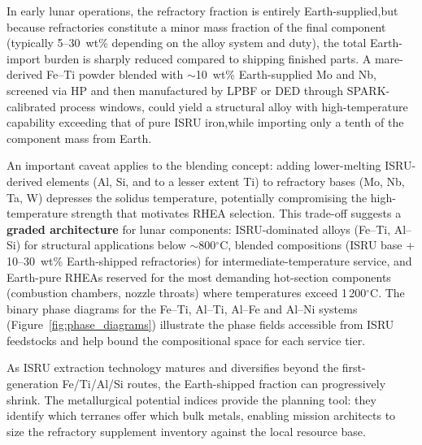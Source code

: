 \documentclass[11pt,a4paper]{article}
\begin{document}
In early lunar operations, the refractory fraction is entirely Earth-supplied,but because refractories constitute a minor mass fraction of the final component (typically 5--30~wt\% depending on the alloy system and duty), the total Earth-import burden is sharply reduced compared to shipping finished parts. A mare-derived Fe--Ti powder blended with $\sim$10~wt\% Earth-supplied Mo and Nb, screened via HP and then manufactured by LPBF or DED through SPARK-calibrated process windows, could yield a structural alloy with high-temperature capability exceeding that of pure ISRU iron,while importing only a tenth of the component mass from Earth.

An important caveat applies to the blending concept: adding lower-melting ISRU-derived elements (Al, Si, and to a lesser extent Ti) to refractory bases (Mo, Nb, Ta, W) depresses the solidus temperature, potentially compromising the high-temperature strength that motivates RHEA selection. This trade-off suggests a \textbf{graded architecture} for lunar components: ISRU-dominated alloys (Fe--Ti, Al--Si) for structural applications below $\sim$800$^\circ$C, blended compositions (ISRU base + 10--30~wt\% Earth-shipped refractories) for intermediate-temperature service, and Earth-pure RHEAs reserved for the most demanding hot-section components (combustion chambers, nozzle throats) where temperatures exceed 1\,200$^\circ$C. The binary phase diagrams for the Fe--Ti, Al--Ti, Al--Fe and Al--Ni systems (Figure~\ref{fig:phase_diagrams}) illustrate the phase fields accessible from ISRU feedstocks and help bound the compositional space for each service tier.

As ISRU extraction technology matures and diversifies beyond the first-generation Fe/Ti/Al/Si routes, the Earth-shipped fraction can progressively shrink. The metallurgical potential indices provide the planning tool: they identify which terranes offer which bulk metals, enabling mission architects to size the refractory supplement inventory against the local resource base.
\end{document}
